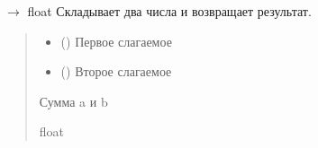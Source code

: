 \documentclass[letterpaper,10pt,russian]{sphinxmanual}
\begin{document}
\begin{fulllineitems}
\label{\detokenize{Calculator:Calculator.add}}
\pysigstartsignatures
\pysiglinewithargsret
{}
{\sphinxparamcomma {}}
{{ $\rightarrow$ float}}
\pysigstopsignatures
\sphinxAtStartPar
Складывает два числа и возвращает результат.
\begin{quote}\begin{description}
\begin{itemize}
\item {} 
\sphinxAtStartPar
{} () \textendash{} Первое слагаемое

\item {} 
\sphinxAtStartPar
{} () \textendash{} Второе слагаемое

\end{itemize}

\sphinxAtStartPar
Сумма a и b

\sphinxAtStartPar
float

\end{description}\end{quote}
\begin{description}
\begin{sphinxVerbatim}[commandchars=\\\{\}]
 
\end{sphinxVerbatim}

\end{description}

\end{fulllineitems}

\end{document}
